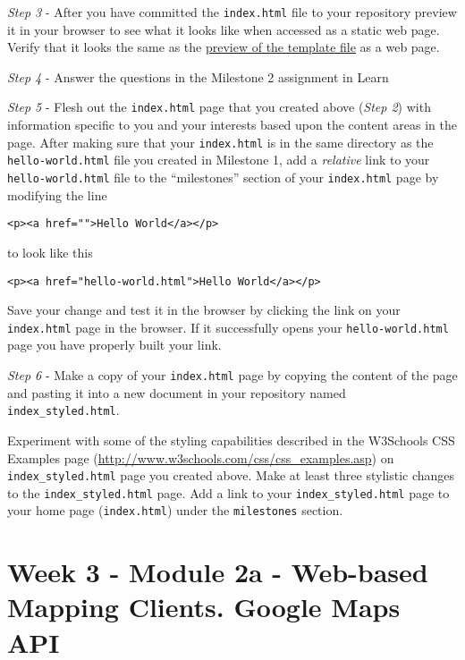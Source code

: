\documentclass[]{book}
\begin{document}
\emph{Step 3} - After you have committed the \texttt{index.html} file to
your repository preview it in your browser to see what it looks like
when accessed as a static web page. Verify that it looks the same as the
\href{http://karlbenedict.com/GEOG485-585/sample-files/homePageTemplate.html}{preview
of the template file} as a web page.

\emph{Step 4} - Answer the questions in the Milestone 2 assignment in
Learn

\emph{Step 5} - Flesh out the \texttt{index.html} page that you created
above (\emph{Step 2}) with information specific to you and your
interests based upon the content areas in the page. After making sure
that your \texttt{index.html} is in the same directory as the
\texttt{hello-world.html} file you created in Milestone 1, add a
\emph{relative} link to your \texttt{hello-world.html} file to the
``milestones'' section of your \texttt{index.html} page by modifying the
line

\begin{verbatim}
<p><a href="">Hello World</a></p>
\end{verbatim}

to look like this

\begin{verbatim}
<p><a href="hello-world.html">Hello World</a></p>
\end{verbatim}

Save your change and test it in the browser by clicking the link on your
\texttt{index.html} page in the browser. If it successfully opens your
\texttt{hello-world.html} page you have properly built your link.

\emph{Step 6} - Make a copy of your \texttt{index.html} page by copying
the content of the page and pasting it into a new document in your
repository named \texttt{index\_styled.html}.

Experiment with some of the styling capabilities described in the
W3Schools CSS Examples page
(\url{http://www.w3schools.com/css/css_examples.asp}) on
\texttt{index\_styled.html} page you created above. Make at least three
stylistic changes to the \texttt{index\_styled.html} page. Add a link to
your \texttt{index\_styled.html} page to your home page
(\texttt{index.html}) under the \texttt{milestones} section.

\chapter{Week 3 - Module 2a - Web-based Mapping Clients. Google Maps
API}\label{week03}
\end{document}
